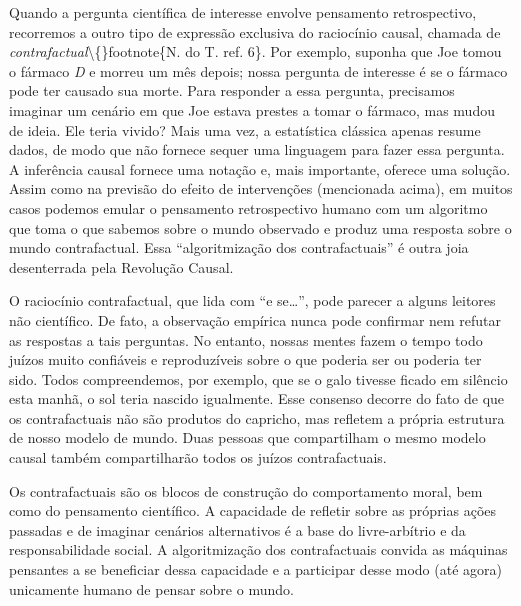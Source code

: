 \documentclass[11pt,a5paper,twoside]{book}
\begin{document}
Quando a pergunta científica de interesse envolve pensamento retrospectivo, recorremos a outro tipo de expressão exclusiva do raciocínio causal, chamada de \textit{contrafactual}\textbackslash\{\}footnote\{N. do T. ref. 6\}. Por exemplo, suponha que Joe tomou o fármaco \textit{D} e morreu um mês depois; nossa pergunta de interesse é se o fármaco pode ter causado sua morte. Para responder a essa pergunta, precisamos imaginar um cenário em que Joe estava prestes a tomar o fármaco, mas mudou de ideia. Ele teria vivido? Mais uma vez, a estatística clássica apenas resume dados, de modo que não fornece sequer uma linguagem para fazer essa pergunta. A inferência causal fornece uma notação e, mais importante, oferece uma solução. Assim como na previsão do efeito de intervenções (mencionada acima), em muitos casos podemos emular o pensamento retrospectivo humano com um algoritmo que toma o que sabemos sobre o mundo observado e produz uma resposta sobre o mundo contrafactual. Essa “algoritmização dos contrafactuais” é outra joia desenterrada pela Revolução Causal.

O raciocínio contrafactual, que lida com “e se…”, pode parecer a alguns leitores não científico. De fato, a observação empírica nunca pode confirmar nem refutar as respostas a tais perguntas. No entanto, nossas mentes fazem o tempo todo juízos muito confiáveis e reproduzíveis sobre o que poderia ser ou poderia ter sido. Todos compreendemos, por exemplo, que se o galo tivesse ficado em silêncio esta manhã, o sol teria nascido igualmente. Esse consenso decorre do fato de que os contrafactuais não são produtos do capricho, mas refletem a própria estrutura de nosso modelo de mundo. Duas pessoas que compartilham o mesmo modelo causal também compartilharão todos os juízos contrafactuais.

Os contrafactuais são os blocos de construção do comportamento moral, bem como do pensamento científico. A capacidade de refletir sobre as próprias ações passadas e de imaginar cenários alternativos é a base do livre-arbítrio e da responsabilidade social. A algoritmização dos contrafactuais convida as máquinas pensantes a se beneficiar dessa capacidade e a participar desse modo (até agora) unicamente humano de pensar sobre o mundo.
\end{document}
